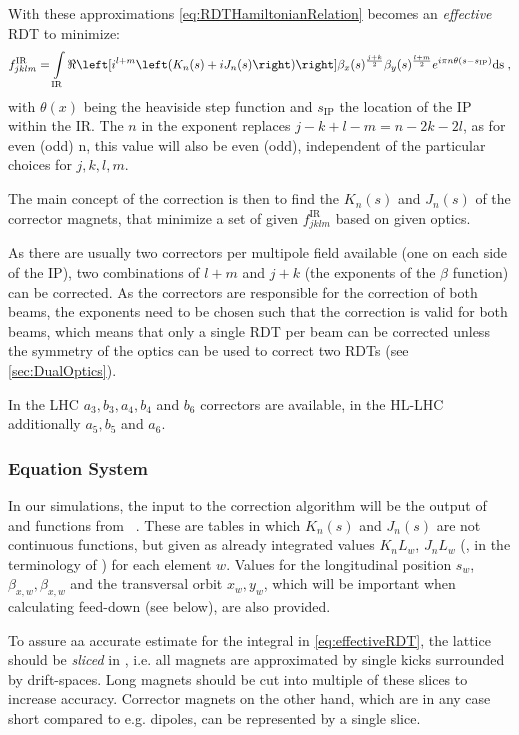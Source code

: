 With these approximations \cref{eq:RDTHamiltonianRelation} becomes an \textit{effective} RDT to minimize:
%
\begin{equation}
    \label{eq:effectiveRDT}
    f^\text{IR}_{jklm} =  \int\limits_\text{IR} 
    \ReOf{    
     i^{l+m}
     \left(K_{n}(s) + iJ_{n}(s) \right) 
    }
        \beta_x(s)^{\frac{j+k}{2}}
        \beta_y(s)^{\frac{l+m}{2}} 
     e^{i \pi n \theta(s - s_\text{IP})}
    \rm{d}s \; ,
\end{equation}
%
with $\theta(x)$ being the heaviside step function and $s_\text{IP}$ the location of 
the IP within the IR.
The $n$ in the exponent replaces $j - k + l - m = n - 2k - 2l$, 
as for even (odd) n, this value will also be even (odd), 
independent of the particular choices for $j,k,l,m$.

The main concept of the correction is then to find the $K_n(s)$ and $J_n(s)$ of 
the corrector magnets, that minimize a set of given $f^\text{IR}_{jklm}$ based on given optics.

As there are usually two correctors per multipole field available (one on each side of the IP), 
two combinations of $l+m$ and $j+k$ (the exponents of the $\beta$ function)
can be corrected.
As the correctors are responsible for the correction of both beams, 
the exponents need to be chosen such that the correction is valid for both beams, 
which means that only a single RDT per beam can be corrected 
unless the symmetry of the optics can be used to correct
two RDTs (see \cref{sec:DualOptics}).

In the LHC $a_3, b_3, a_4, b_4$ and $b_6$ correctors are available,
in the HL-LHC additionally $a_5, b_5$ and $a_6$.


\subsubsection{Equation System}

In our simulations, the input to the correction algorithm will be the output 
of  and  functions from ~\cite{CERNMadX}.
These are tables in which $K_n(s)$ and $J_n(s)$ are not continuous functions, 
but given as already integrated values $K_nL_w$, $J_nL_w$ 
(,  in the terminology of ) for each element $w$.
Values for the longitudinal position $s_w$, $\beta_{x,w}, \beta_{x,w}$ and the transversal orbit $x_w, y_w$, which will be important 
when calculating feed-down (see below), are also provided.


To assure aa accurate estimate for the integral in \cref{eq:effectiveRDT}, 
the lattice should be \textit{sliced} in , 
i.e. all magnets are approximated by single kicks surrounded by drift-spaces. 
Long magnets should be cut into multiple of these slices to increase accuracy. 
Corrector magnets on the other hand, which are in any case short compared to e.g. dipoles, 
can  be represented by a single slice.

